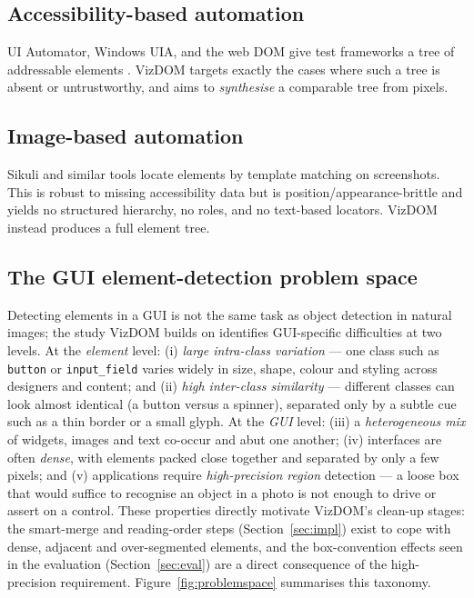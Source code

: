 \documentclass[11pt,a4paper]{article}
\newcommand{\code}[1]{\texttt{#1}}
\begin{document}
\subsection{Accessibility-based automation}
UI Automator, Windows UIA, and the web DOM give test frameworks a tree of
addressable elements \cite{uiautomator,appium}. VizDOM targets exactly the cases
where such a tree is absent or untrustworthy, and aims to \emph{synthesise} a
comparable tree from pixels.

\subsection{Image-based automation}
Sikuli and similar tools \cite{yeh2009sikuli} locate elements by template matching
on screenshots. This is robust to missing accessibility data but is
position/appearance-brittle and yields no structured hierarchy, no roles, and no
text-based locators. VizDOM instead produces a full element tree.

\subsection{The GUI element-detection problem space}
Detecting elements in a GUI is not the same task as object detection in natural
images; the study VizDOM builds on \cite{xie2020uied} identifies GUI-specific
difficulties at two levels. At the \emph{element} level: (i) \emph{large intra-class
variation} --- one class such as \code{button} or \code{input\_field} varies widely
in size, shape, colour and styling across designers and content; and (ii) \emph{high
inter-class similarity} --- different classes can look almost identical (a button
versus a spinner), separated only by a subtle cue such as a thin border or a small
glyph. At the \emph{GUI} level: (iii) a \emph{heterogeneous mix} of widgets, images
and text co-occur and abut one another; (iv) interfaces are often \emph{dense}, with
elements packed close together and separated by only a few pixels; and (v)
applications require \emph{high-precision region} detection --- a loose box that would
suffice to recognise an object in a photo is not enough to drive or assert on a
control. These properties directly motivate VizDOM's clean-up stages: the smart-merge
and reading-order steps (Section~\ref{sec:impl}) exist to cope with dense, adjacent
and over-segmented elements, and the box-convention effects seen in the evaluation
(Section~\ref{sec:eval}) are a direct consequence of the high-precision requirement.
Figure~\ref{fig:problemspace} summarises this taxonomy.
\end{document}
